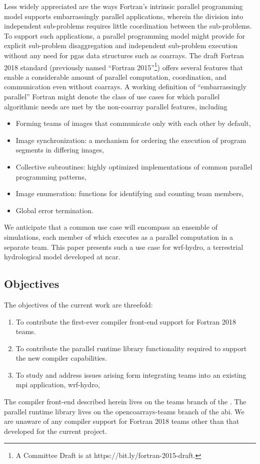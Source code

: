 Less widely appreciated are the ways Fortran's intrinsic parallel programming model supports embarrassingly
parallel applications, wherein the division into independent sub-problems requires little coordination between
the sub-problems. To support such applications, a parallel programming
model might provide for explicit sub-problem disaggregation and independent sub-problem execution without any need for
\gls{pgas} data structures such as \glspl{coarray}.  The draft Fortran 2018 standard
(previously named ``Fortran 2015''\footnote{A Committee Draft is at https://bit.ly/fortran-2015-draft.}) offers several
features that enable a considerable amount of parallel computation, coordination, and communication
even without \glspl{coarray}.  A working definition of ``embarrassingly parallel'' Fortran might denote the class of
use cases for which parallel algorithmic needs are met by the non-\gls{coarray} parallel features, including
\begin{itemize}
   \item Forming teams of images that communicate only with each other by default,
   \item Image synchronization: a mechanism for ordering the execution of program segments in differing images,
   \item Collective subroutines: highly optimized implementations of common parallel programming patterns,
   \item Image enumeration: functions for identifying and counting team members,
   \item Global error termination.
\end{itemize}
We anticipate that a common use case will encompass an ensemble of simulations, each member of
which executes as a parallel computation in a separate team.  This paper presents such a use case for
\gls{wrf-hydro}, a terrestrial hydrological model developed at \gls{ncar}.

\subsection{Objectives}\label{sec:objectives}
The objectives of the current work are threefold:
\begin{enumerate}
  \item To contribute the first-ever compiler front-end support for Fortran 2018 teams.
  \item To contribute the parallel runtime library functionality required to support the new compiler capabilities.
  \item To study and address issues arising form integrating teams into an existing \gls{mpi} application, \gls{wrf-hydro},
\end{enumerate}
The compiler front-end described herein lives on the teams branch of the
. The parallel runtime library lives
on the opencoarrays-teams branch of the 
\gls{abi}.  We are unaware of any compiler support for Fortran 2018 teams other than that developed for the current
project.

